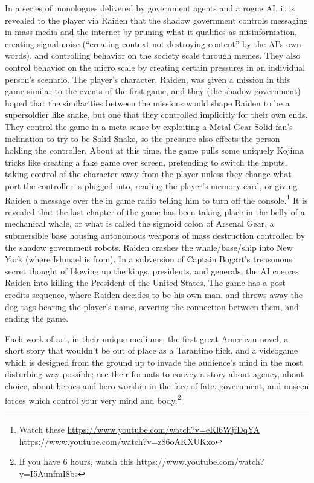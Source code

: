 \documentclass[
]{article}
\begin{document}
In a series of monologues delivered by government agents and a rogue AI,
it is revealed to the player via Raiden that the shadow government
controls messaging in mass media and the internet by pruning what it
qualifies as misinformation, creating signal noise (``creating context
not destroying content'' by the AI's own words), and controlling
behavior on the society scale through memes. They also control behavior
on the micro scale by creating certain pressures in an individual
person's scenario. The player's character, Raiden, was given a mission
in this game similar to the events of the first game, and they (the
shadow government) hoped that the similarities between the missions
would shape Raiden to be a supersoldier like snake, but one that they
controlled implicitly for their own ends. They control the game in a
meta sense by exploiting a Metal Gear Solid fan's inclination to try to
be Solid Snake, so the pressure also effects the person holding the
controller. About at this time, the game pulls some uniquely Kojima
tricks like creating a fake game over screen, pretending to switch the
inputs, taking control of the character away from the player unless they
change what port the controller is plugged into, reading the player's
memory card, or giving Raiden a message over the in game radio telling
him to turn off the console.\footnote{Watch these
  \url{https://www.youtube.com/watch?v=eKl6WjfDqYA}
  https://www.youtube.com/watch?v=z86oAKXUKxo} It is revealed that the
last chapter of the game has been taking place in the belly of a
mechanical whale, or what is called the sigmoid colon of Arsenal Gear, a
submersible base housing autonomous weapons of mass destruction
controlled by the shadow government robots. Raiden crashes the
whale/base/ship into New York (where Ishmael is from). In a subversion
of Captain Bogart's treasonous secret thought of blowing up the kings,
presidents, and generals, the AI coerces Raiden into killing the
President of the United States. The game has a post credits sequence,
where Raiden decides to be his own man, and throws away the dog tags
bearing the player's name, severing the connection between them, and
ending the game.

Each work of art, in their unique mediums; the first great American
novel, a short story that wouldn't be out of place as a Tarantino flick,
and a videogame which is designed from the ground up to invade the
audience's mind in the most disturbing way possible; use their formats
to convey a story about agency, about choice, about heroes and hero
worship in the face of fate, government, and unseen forces which control
your very mind and body.\footnote{If you have 6 hours, watch this
  https://www.youtube.com/watch?v=I5AunfmI8bs}
\end{document}
